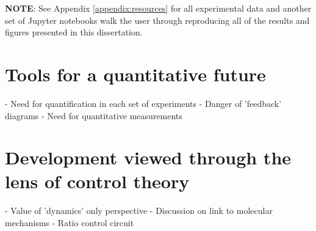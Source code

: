 \textbf{NOTE}: See Appendix \ref{appendix:resources} for all experimental data and another set of Jupyter notebooks walk the user through reproducing all of the results and figures presented in this dissertation.











\section{ Tools for a quantitative future }

- Need for quantification in each set of experiments
- Danger of 'feedback' diagrams
- Need for quantitative measurements


\section{ Development viewed through the lens of control theory }

- Value of 'dynamics' only perspective
- Discussion on link to molecular mechanisms
- Ratio control circuit











